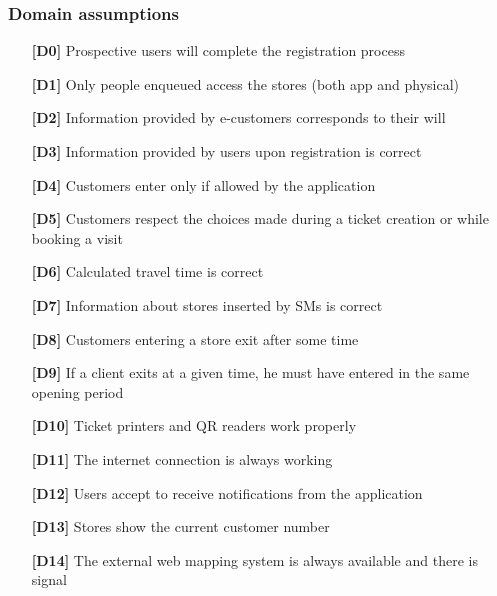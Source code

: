 
\subsubsection{Domain assumptions}

\begin{itemize}[itemsep=-1mm, topsep=-1mm]
	\item [\textbf{[D0]}] Prospective users will complete the registration process
	\item [\textbf{[D1]}] Only people enqueued access the stores (both app and physical)
	\item [\textbf{[D2]}] Information provided by e-customers corresponds to their will
	\item [\textbf{[D3]}] Information provided by users upon registration is correct
	\item [\textbf{[D4]}] Customers enter only if allowed by the application
	\item [\textbf{[D5]}] Customers respect the choices made during a ticket creation or while booking a visit
	\item [\textbf{[D6]}] Calculated travel time is correct
	\item [\textbf{[D7]}] Information about stores inserted by SMs is correct
	\item [\textbf{[D8]}] Customers entering a store exit after some time
	\item [\textbf{[D9]}] If a client exits at a given time, he must have entered in the same opening period
	\item [\textbf{[D10]}] Ticket printers and QR readers work properly
	\item [\textbf{[D11]}] The internet connection is always working
	\item [\textbf{[D12]}] Users accept to receive notifications from the application
	\item [\textbf{[D13]}] Stores show the current customer number
	\item [\textbf{[D14]}] The external web mapping system is always available and there is signal
\end{itemize}
